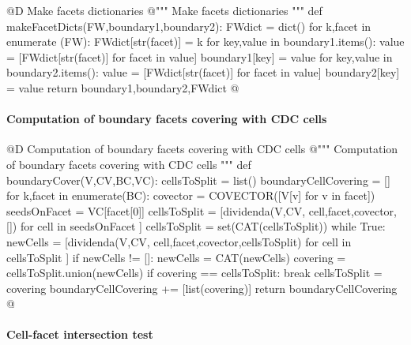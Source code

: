 \documentclass[11pt,oneside]{article}	%
\begin{document}
@D Make facets dictionaries
@{""" Make facets dictionaries """
def makeFacetDicts(FW,boundary1,boundary2):
	FWdict = dict()
	for k,facet in enumerate (FW): FWdict[str(facet)] = k
	for key,value in boundary1.items():
		value = [FWdict[str(facet)] for facet in value]
		boundary1[key] = value
	for key,value in boundary2.items():
		value = [FWdict[str(facet)] for facet in value]
		boundary2[key] = value
	return boundary1,boundary2,FWdict
@}


\paragraph{Computation of boundary facets covering with CDC cells}

@D Computation of boundary facets covering with CDC cells
@{""" Computation of boundary facets covering with CDC cells """
def boundaryCover(V,CV,BC,VC):
	cellsToSplit = list()
	boundaryCellCovering = []
	for k,facet in enumerate(BC):
		covector = COVECTOR([V[v] for v in facet])
		seedsOnFacet = VC[facet[0]]
		cellsToSplit = [dividenda(V,CV, cell,facet,covector,[]) 
							for cell in seedsOnFacet ]
		cellsToSplit = set(CAT(cellsToSplit))
		while True:
			newCells = [dividenda(V,CV, cell,facet,covector,cellsToSplit) 
							for cell in cellsToSplit ]
			if newCells != []: newCells = CAT(newCells)
			covering = cellsToSplit.union(newCells)
			if covering == cellsToSplit: 
				break
			cellsToSplit = covering
		boundaryCellCovering += [list(covering)]
	return boundaryCellCovering
@}

\paragraph{Cell-facet intersection test}
\end{document}
